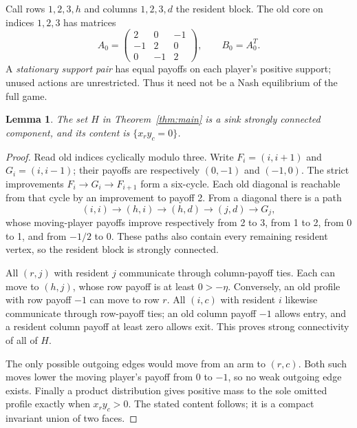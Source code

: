 \documentclass[11pt,a4paper]{article}
\numberwithin{equation}{section}
\newtheorem{lemma}[theorem]{Lemma}
\theoremstyle{definition}
\begin{document}
Call rows \(1,2,3,h\) and columns \(1,2,3,d\) the resident block.
The old core on indices \(1,2,3\) has matrices
\[
 A_0=\begin{pmatrix}2&0&-1\\-1&2&0\\0&-1&2\end{pmatrix},
 \qquad B_0=A_0^T.
\]
A \emph{stationary support pair} has equal payoffs on each player's
positive support; unused actions are unrestricted. Thus it need not
be a Nash equilibrium of the full game.

\begin{lemma}\label{lem:sink}
The set \(H\) in Theorem~\ref{thm:main} is a sink strongly connected
component, and its content is \(\{x_r y_c=0\}\).
\end{lemma}
\begin{proof}
Read old indices cyclically modulo three. Write
\(F_i=(i,i+1)\) and \(G_i=(i,i-1)\); their payoffs are respectively
\((0,-1)\) and \((-1,0)\). The strict improvements
\(F_i\to G_i\to F_{i+1}\) form a six-cycle. Each old diagonal is
reachable from that cycle by an improvement to payoff 2. From a diagonal
there is a path
\[
 (i,i)\longrightarrow(h,i)\longrightarrow(h,d)
 \longrightarrow(j,d)\longrightarrow G_j,
\]
whose moving-player payoffs improve respectively from 2 to 3, from 1
to 2, from 0 to 1, and from \(-1/2\) to 0. These paths also contain
every remaining resident vertex, so the resident block is strongly
connected.

All \((r,j)\) with resident \(j\) communicate through column-payoff
ties. Each can move to \((h,j)\), whose row payoff is at least
\(0> -\eta\). Conversely, an old profile with row payoff \(-1\)
can move to row \(r\). All \((i,c)\) with resident \(i\) likewise
communicate through row-payoff ties; an old column payoff \(-1\)
allows entry, and a resident column payoff at least zero allows exit.
This proves strong connectivity of all of \(H\).

The only possible outgoing edges would move from an arm to \((r,c)\).
Both such moves lower the moving player's payoff from 0 to \(-1\),
so no weak outgoing edge exists. Finally a product distribution gives
positive mass to the sole omitted profile exactly when \(x_r y_c>0\).
The stated content follows; it is a compact invariant union of two faces.
\end{proof}
\end{document}
